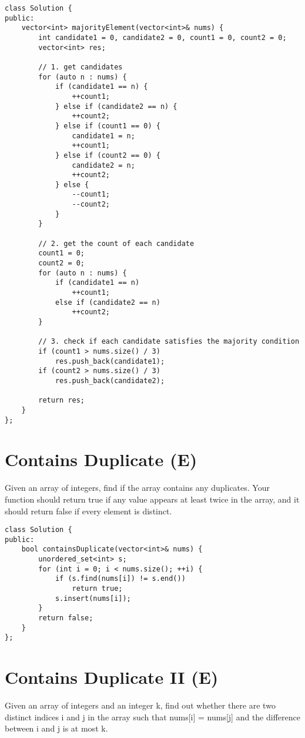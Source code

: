 \begin{lstlisting}
class Solution {
public:
    vector<int> majorityElement(vector<int>& nums) {
        int candidate1 = 0, candidate2 = 0, count1 = 0, count2 = 0;
        vector<int> res;
        
        // 1. get candidates
        for (auto n : nums) {
            if (candidate1 == n) {
                ++count1;
            } else if (candidate2 == n) {
                ++count2;
            } else if (count1 == 0) {
                candidate1 = n;
                ++count1;
            } else if (count2 == 0) {
                candidate2 = n;
                ++count2;
            } else {
                --count1;
                --count2;
            }
        }
        
        // 2. get the count of each candidate
        count1 = 0;
        count2 = 0;
        for (auto n : nums) {
            if (candidate1 == n)
                ++count1;
            else if (candidate2 == n)
                ++count2;
        }
        
        // 3. check if each candidate satisfies the majority condition
        if (count1 > nums.size() / 3)
            res.push_back(candidate1);
        if (count2 > nums.size() / 3)
            res.push_back(candidate2);
            
        return res;
    }
};
\end{lstlisting}


\section{Contains Duplicate (E)}
Given an array of integers, find if the array contains any duplicates. Your function should return true if any value appears at least twice in the array, and it should return false if every element is distinct. \\

\begin{lstlisting}
class Solution {
public:
    bool containsDuplicate(vector<int>& nums) {
        unordered_set<int> s;
        for (int i = 0; i < nums.size(); ++i) {
            if (s.find(nums[i]) != s.end())
                return true;
            s.insert(nums[i]);
        }
        return false;
    }
};
\end{lstlisting}


\section{Contains Duplicate II (E)}
Given an array of integers and an integer k, find out whether there are two distinct indices i and j in the array such that nums[i] = nums[j] and the difference between i and j is at most k. \\

